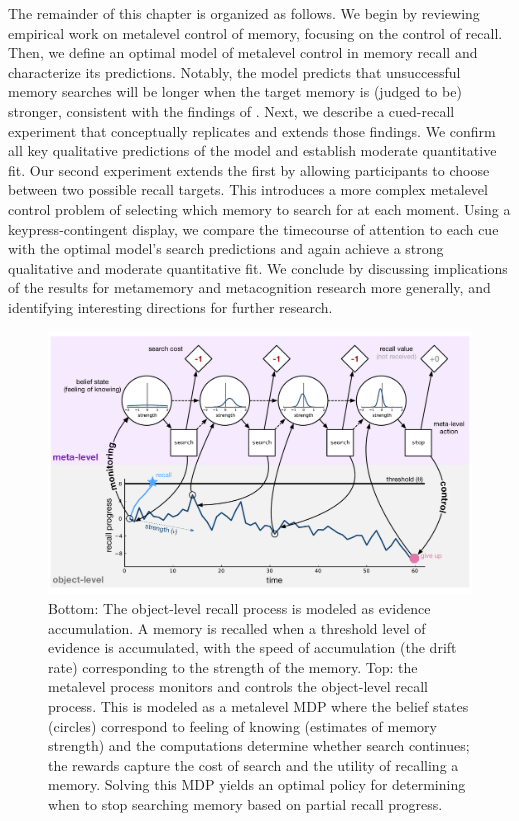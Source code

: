 The remainder of this chapter is organized as follows. We begin by reviewing empirical work on metalevel control of memory, focusing on the control of recall. Then, we define an optimal model of metalevel control in memory recall and characterize its predictions. Notably, the model predicts that unsuccessful memory searches will be longer when the target memory is (judged to be) stronger, consistent with the findings of \citet{costermans1992confidence}. Next, we describe a cued-recall experiment that conceptually replicates and extends those findings. We confirm all key qualitative predictions of the model and establish moderate quantitative fit. Our second experiment extends the first by allowing participants to choose between two possible recall targets. This introduces a more complex metalevel control problem of selecting which memory to search for at each moment. Using a keypress-contingent display, we compare the timecourse of attention to each cue with the optimal model's search predictions and again achieve a strong qualitative and moderate quantitative fit. We conclude by discussing implications of the results for metamemory and metacognition research more generally, and identifying interesting directions for further research.


\begin{figure}[t!]
  \centering
  \includegraphics[width=\textwidth]{figs/memory/model.pdf}
  \caption{
    Bottom: The object-level recall process is modeled as evidence accumulation. A memory is recalled when a threshold level of evidence is accumulated, with the speed of accumulation (the drift rate) corresponding to the strength of the memory. Top: the metalevel process monitors and controls the object-level recall process. This is modeled as a metalevel MDP where the belief states (circles) correspond to feeling of knowing (estimates of memory strength) and the computations determine whether search continues; the rewards capture the cost of search and the utility of recalling a memory. Solving this MDP yields an optimal policy for determining when to stop searching memory based on partial recall progress.
  }
  \label{fig:model-diagram}
\end{figure}

